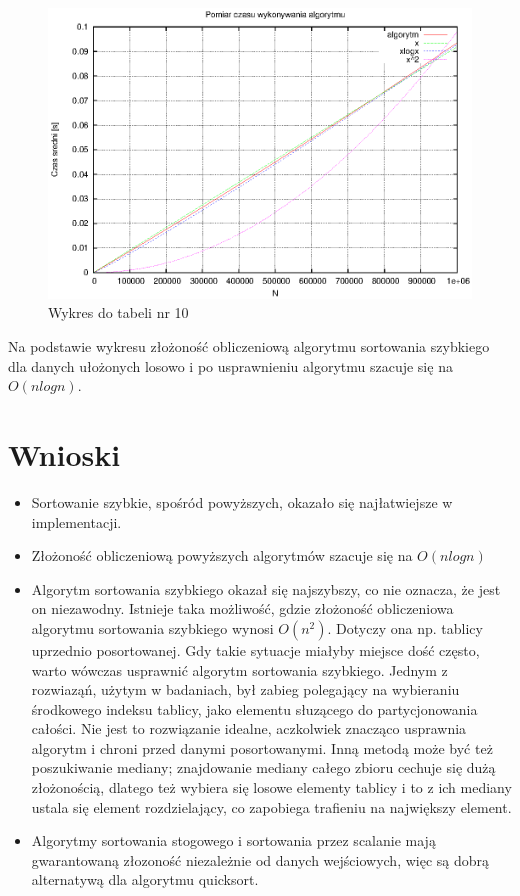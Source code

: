 \documentclass[a4paper,11pt]{article}
\begin{document}
\begin{enumerate}
\begin{table}[th]
\begin{tabular}{|l|l|l|}
\hline
    \end{tabular}
    \end{table}
    \newpage
 \begin{figure}[!h]
\centering
\includegraphics[width=1\textwidth]{../prj/wykres73.eps}
\caption{Wykres do tabeli nr 10}
\label{Wykres do tabeli nr 10}
\end{figure} 
Na podstawie wykresu złożoność obliczeniową algorytmu sortowania szybkiego dla danych ułożonych losowo i po usprawnieniu algorytmu szacuje się na $ O(nlogn) $.
\newpage
\section{Wnioski}
\begin{itemize}
 \item Sortowanie szybkie, spośród powyższych, okazało się najłatwiejsze w implementacji.
 \item Złożoność obliczeniową powyższych algorytmów szacuje się na $ O(n logn) $
 \item Algorytm sortowania szybkiego okazał się najszybszy, co nie oznacza, że jest on niezawodny. Istnieje taka możliwość, gdzie złożoność obliczeniowa 
 algorytmu sortowania szybkiego wynosi $ O(n^{2}) $. Dotyczy ona np. tablicy uprzednio posortowanej. Gdy takie sytuacje miałyby miejsce dość często, warto wówczas usprawnić algorytm sortowania szybkiego. Jednym z rozwiaząń, użytym w badaniach, był zabieg 
 polegający na wybieraniu środkowego indeksu tablicy, jako elementu słuzącego do partycjonowania całości. Nie jest to rozwiązanie idealne, aczkolwiek znacząco usprawnia algorytm i chroni przed 
 danymi posortowanymi. Inną metodą może być też poszukiwanie mediany; znajdowanie mediany całego zbioru cechuje się dużą złożonością, dlatego też 
 wybiera się losowe elementy tablicy i to z ich mediany ustala się element rozdzielający, co zapobiega trafieniu na największy element.
 \item Algorytmy sortowania stogowego i sortowania przez scalanie mają gwarantowaną złozoność niezależnie od danych wejściowych, więc
 są dobrą alternatywą dla algorytmu quicksort.
\end{itemize}


\end{enumerate}
\end{document}
